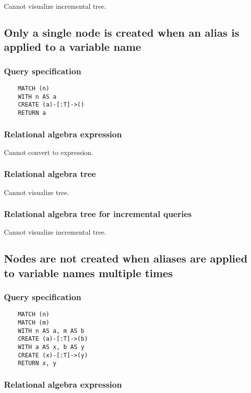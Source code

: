 	Cannot visualize incremental tree.
	\subsection{Only a single node is created when an alias is applied to a variable name}

	\subsubsection*{Query specification}

	\begin{lstlisting}
	MATCH (n)
	WITH n AS a
	CREATE (a)-[:T]->()
	RETURN a
	\end{lstlisting}


	\subsubsection*{Relational algebra expression}

	Cannot convert to expression.

	\subsubsection*{Relational algebra tree}

	Cannot visualize tree.

	\subsubsection*{Relational algebra tree for incremental queries}

	Cannot visualize incremental tree.
	\subsection{Nodes are not created when aliases are applied to variable names multiple times}

	\subsubsection*{Query specification}

	\begin{lstlisting}
	MATCH (n)
	MATCH (m)
	WITH n AS a, m AS b
	CREATE (a)-[:T]->(b)
	WITH a AS x, b AS y
	CREATE (x)-[:T]->(y)
	RETURN x, y
	\end{lstlisting}


	\subsubsection*{Relational algebra expression}

